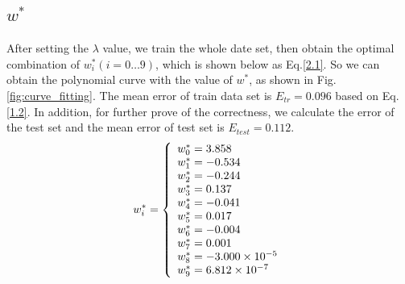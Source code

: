 \documentclass[letterpaper,12pt]{article}
\numberwithin{equation}{section}
\begin{document}
\subsection{$w^{*}$}
After setting the $\lambda$ value, we train the whole date set, then obtain the optimal combination of $w_{i}^{*} \left(i=0 \ldots 9 \right)$, which is shown below as Eq.\eqref{2.1}. So we can obtain the polynomial curve with the value of $w^{*}$, as shown in Fig.\ref{fig:curve_fitting}. The mean error of train data set is $E_{tr}=0.096$ based on Eq.\eqref{1.2}. In addition, for further prove of the correctness, we calculate the error of the test set and the mean error of test set is $E_{test}=0.112$. 
 \begin{equation}\label{2.1}
 \vspace{+2cm}
 w_{i}^{*}=\left\{
 \begin{array}{l}
w_{0}^{*}=3.858 \\
w_{1}^{*}=-0.534 \\
w_{2}^{*}=-0.244 \\
w_{3}^{*}=0.137 \\
w_{4}^{*}=-0.041 \\
w_{5}^{*}=0.017 \\
w_{6}^{*}=-0.004 \\
w_{7}^{*}=0.001 \\
w_{8}^{*}=-3.000\times10^{-5} \\
w_{9}^{*}=6.812\times10^{-7} \\
\end{array}
\right.
 \end{equation}
\end{document}
